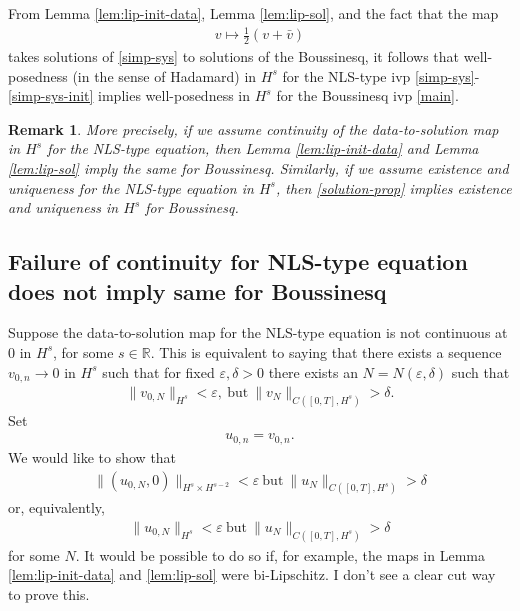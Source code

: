 \documentclass{amsart}
\newtheorem{remark}[theorem]{Remark}
\newcommand{\rr}{\mathbb{R}}
\newcommand{\ee}{\varepsilon}
\begin{document}
From Lemma \ref{lem:lip-init-data}, Lemma \ref{lem:lip-sol}, and the fact that
the map
%
%
\begin{equation}
  \label{solution-prop}
\begin{split}
  v \mapsto \frac{1}{2} (v + \bar{v}) 
\end{split}
\end{equation}
%
%
takes solutions of \eqref{simp-sys} to solutions of the Boussinesq, it follows
that well-posedness (in the sense of Hadamard) in $H^{s}$ for the NLS-type ivp
\eqref{simp-sys}-\eqref{simp-sys-init} 
implies well-posedness in $H^{s}$ for the Boussinesq ivp \eqref{main}.
%
%
\begin{framed}
%
%
\begin{remark}
More precisely, if we assume continuity of the data-to-solution map in $H^{s}$ for the NLS-type equation, then Lemma \ref{lem:lip-init-data}
and Lemma \ref{lem:lip-sol} imply the same for Boussinesq. Similarly, if we assume existence and uniqueness for the NLS-type equation in $H^{s}$, then 
\eqref{solution-prop} implies existence and uniqueness in
$H^{s}$ for Boussinesq.
\label{rem:wp-imp-wp}
\end{remark}
%
%
\end{framed}
%
\subsection{Failure of continuity for NLS-type equation does not imply same for Boussinesq} 
\label{ssec:ip-no-ip}
%
Suppose the data-to-solution map for the NLS-type equation is not continuous at
$0$ in $H^{s}$, for some $s \in \rr$. This is equivalent to saying that 
there exists a sequence $v_{0,n} \to 0$ in $H^{s}$ such that for fixed $\ee, \delta > 0$ there exists an $N = N(\ee, \delta)$ such that
%
%
\begin{equation*}
\begin{split}
\| v_{0,N} \|_{H^{s}} < \ee, \ \text{but} \ \| v_{N} \|_{C([0,T], H^{s})} >
\delta.
\end{split}
\end{equation*}
%
%
Set
%
%
\begin{equation*}
\begin{split}
u_{0,n} = v_{0,n}.
\end{split}
\end{equation*}
%
%
We would like to show that
%
%
\begin{equation*}
\begin{split}
\| (u_{0,N}, 0) \|_{H^{s} \times H^{s-2}} < \ee \ \text{but} \ \| u_{N} \|_{C([0,T], H^{s})} > \delta
\end{split}
\end{equation*}
%
%
%
%
%
%
or, equivalently, 
%
%
\begin{equation*}
\begin{split}
\| u_{0,N} \|_{H^{s}} < \ee \ \text{but} \ \| u_{N} \|_{C([0, T], H^{s})} >
\delta
\end{split}
\end{equation*}
%
for some $N$. It would be possible to do so if, for example, the maps in Lemma
\ref{lem:lip-init-data} and \ref{lem:lip-sol} were bi-Lipschitz. I don't see a
clear cut way to prove this.
%
%
\end{document}
